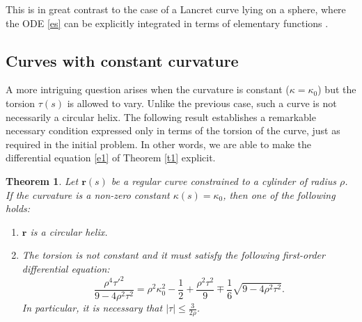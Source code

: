 \documentclass[a4paper,12pt]{amsart}
\theoremstyle{plain}
\newtheorem{theorem}{Theorem}[section]
\theoremstyle{definition}
\newcommand{\bfr}{\mathbf{r}}
\begin{document}
This is in great contrast to the case of a Lancret curve lying on a sphere, where the ODE \eqref{es} can be explicitly integrated in terms of elementary functions   \cite{gray}.

 
 
 
\subsection{Curves with constant curvature}
A more intriguing question arises when the curvature is constant ($\kappa = \kappa_0$) but the torsion $\tau(s)$ is allowed to vary. Unlike the previous case, such a curve is not necessarily a circular helix. The following result establishes a remarkable necessary condition expressed only in terms of the torsion of the curve, just  as required in the initial problem. In other words, we are able to make the differential equation \eqref{e1} of Theorem \ref{t1} explicit.




\begin{theorem}\label{t2}
Let $\mathbf{r}(s)$ be a regular curve constrained to a cylinder of radius $\rho$. If the curvature is a non-zero constant $\kappa(s) = \kappa_0$, then one of the following holds: 
\begin{enumerate}
\item $\bfr$ is a circular helix.
\item The torsion is not constant and it  must satisfy the following first-order   differential equation:
\begin{equation}\label{eqs}
 \frac{\rho^4 \tau'^2}{9 - 4\rho^2\tau^2} = \rho^2\kappa_0^2 - \frac{1}{2} + \frac{\rho^2\tau^2}{9} \mp \frac{1}{6}\sqrt{9 - 4\rho^2\tau^2}. \end{equation}
In particular, it is necessary that $|\tau|\leq \frac{3}{2\rho}$.
\end{enumerate}
\end{theorem}
\end{document}
